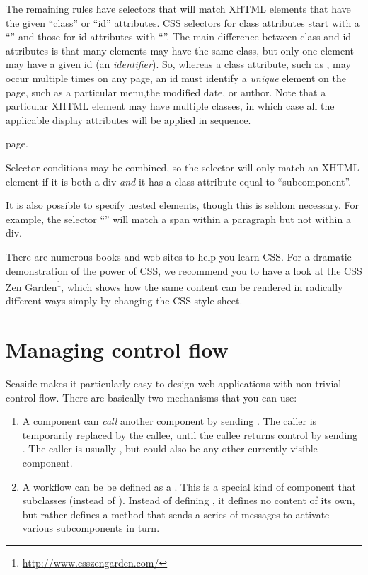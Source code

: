 \documentclass[a4paper,10pt,twoside]{book}
\begin{document}
The remaining rules have selectors that will match XHTML elements that have the given
``class'' or ``id'' attributes.
CSS selectors for class attributes start with a ``'' and those for id attributes
with ``\ct{#}''.
The main difference between class and id attributes is that many elements may have the
same class, but only one element may have a given id (\ie an \emph{identifier}).
So, whereas a class attribute, such as , may occur multiple times on any
page, an id must identify a \emph{unique} element on the page, such as a particular menu,the modified date, or author.
Note that a particular XHTML element may have multiple classes, in which case all the
applicable display attributes will be applied in sequence.

page.

Selector conditions may be combined, so the selector  will only
match an XHTML element if it is both a div \emph{and} it has a class attribute equal to
``subcomponent''.

It is also possible to specify nested elements, though this is seldom necessary.
For example, the selector ``'' will match a span within a paragraph but not
within a div.

There are numerous books and web sites to help you learn CSS.
For a dramatic demonstration of the power of CSS, we recommend you to have a look at the
CSS Zen Garden\footnote{\url{http://www.csszengarden.com/}}, which shows how the same
content can be rendered in radically different ways simply by changing the CSS style
sheet.

\section{Managing control flow}

Seaside makes it particularly easy to design web applications with non-trivial control
flow.
There are basically two mechanisms that you can use:

\begin{enumerate}
\item A component can \emph{call} another component by sending .
The caller is temporarily replaced by the callee, until the callee returns
control by
sending .
The caller is usually , but could also be any other currently visible component.  \item A workflow can be be defined as a .
This is a special kind of component that subclasses  (instead of
). 
Instead of defining , it defines no content of its own, but rather
defines a  method that sends a series of  messages to activate various
subcomponents in turn.
\end{enumerate}
\end{document}
